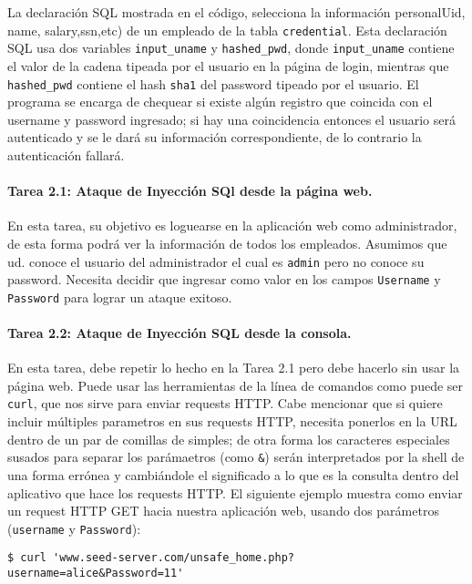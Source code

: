 La declaración SQL mostrada en el código, selecciona la información personalUid, name, salary,ssn,etc) de un empleado  de la tabla {\tt credential}. Esta declaración SQL usa dos variables \texttt{input\_uname} y \texttt{hashed\_pwd}, donde \texttt{input\_uname} contiene el valor de la cadena tipeada por el usuario en la página de login, mientras que \texttt{hashed\_pwd} contiene el hash \texttt{sha1} del password tipeado por el usuario. El programa se encarga de chequear si existe algún registro que coincida con el username y password ingresado; si hay una coincidencia entonces el usuario será autenticado y se le dará su información correspondiente, de lo contrario la autenticación fallará.


\paragraph{Tarea 2.1: Ataque de Inyección SQl desde la página web.}
En esta tarea, su objetivo es loguearse en la aplicación web como administrador, de esta forma podrá ver la información de todos los empleados. Asumimos que ud. conoce el usuario del administrador el cual es {\tt admin} pero no conoce su password. Necesita decidir que ingresar como valor en los campos \texttt{Username} y \texttt{Password} para lograr un ataque exitoso.
	


\paragraph{Tarea 2.2: Ataque de Inyección SQL desde la consola.}  
En esta tarea, debe repetir lo hecho en la Tarea 2.1 pero debe hacerlo sin usar la página web. Puede usar las herramientas de la línea de comandos como puede ser \texttt{curl}, que nos sirve para enviar requests HTTP.
Cabe mencionar que si quiere incluir múltiples parametros en sus requests HTTP, necesita ponerlos en la URL dentro de un par de comillas de simples; de otra forma los caracteres especiales susados para separar los parámaetros (como \texttt{\&}) serán interpretados por la shell de una forma errónea y cambiándole el significado a lo que es la consulta dentro del aplicativo que hace los requests HTTP. El siguiente ejemplo muestra como enviar un request HTTP GET hacia nuestra aplicación web, usando dos parámetros (\texttt{username} y \texttt{Password}):

\begin{lstlisting}
$ curl 'www.seed-server.com/unsafe_home.php?username=alice&Password=11'
\end{lstlisting}

